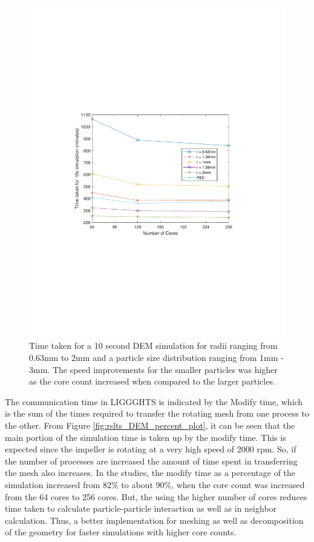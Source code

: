 \documentclass[preprint,11pt,authoryear]{elsarticle}
\begin{document}
\begin{figure}
\centering
\includegraphics[scale=0.85]{rslsts_DEM_alldia_timing_mtlb.pdf}
\caption{ Time taken for a 10 second DEM simulation for radii ranging from
 0.63mm to 2mm and a particle size distribution ranging from 1mm - 3mm. The speed improvements 
 for the smaller particles was higher as the core count increased when compared to the larger particles.}
\label{fig:rslts_DEM_timing_studies}
\end{figure}

The communication time in LIGGGHTS is indicated by the Modify time, which is the sum of the 
times required to transfer the rotating mesh from one process to the other. From Figure 
\ref{fig:rslts_DEM_percent_plot}, it can be seen that the main portion of the simulation time is taken up by 
the modify time. This is expected since the impeller is rotating at a very high speed of 2000 rpm. So, if 
the number of processes are increased the amount of time spent in transferring the mesh also 
increases. In the studies, the modify time as a percentage of the simulation increased from 82\% to 
about 90\%, when the core count was increased from the 64 cores to 256 cores. But, the using the 
higher number of cores reduces time taken to calculate particle-particle interaction as well as in 
neighbor calculation. Thus, a better implementation for meshing as well as decomposition of the 
geometry for faster simulations with higher core counts.
\end{document}
